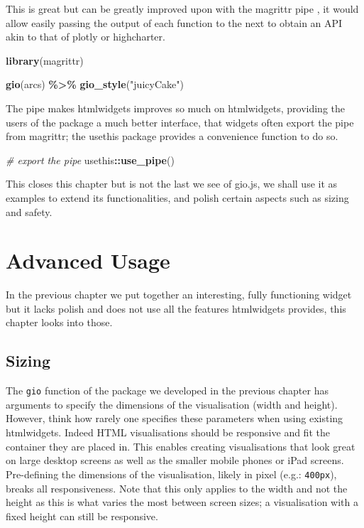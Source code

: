 \documentclass[
]{krantz}
\makeatletter
\newenvironment{Shaded}{\begin{snugshade}}{\end{snugshade}}
\newcommand{\CommentTok}[1]{\textcolor[rgb]{0.37,0.37,0.37}{\textit{#1}}}
\newcommand{\KeywordTok}[1]{\textcolor[rgb]{0.27,0.27,0.27}{\textbf{#1}}}
\newcommand{\NormalTok}[1]{#1}
\newcommand{\OperatorTok}[1]{\textcolor[rgb]{0.43,0.43,0.43}{\textbf{#1}}}
\newcommand{\StringTok}[1]{\textcolor[rgb]{0.5,0.5,0.5}{#1}}
\newenvironment{kframe}{%
\medskip{}
\setlength{\fboxsep}{.8em}
 \def\at@end@of@kframe{}%
 \ifinner\ifhmode%
  \def\at@end@of@kframe{\end{minipage}}%
  \begin{minipage}{\columnwidth}%
 \fi\fi%
 \def\FrameCommand##1{\hskip\@totalleftmargin \hskip-\fboxsep
 \colorbox{shadecolor}{##1}\hskip-\fboxsep
     \hskip-\linewidth \hskip-\@totalleftmargin \hskip\columnwidth}%
 \MakeFramed {\advance\hsize-\width
   \@totalleftmargin\z@ \linewidth\hsize
   \@setminipage}}%
 {\par\unskip\endMakeFramed%
 \at@end@of@kframe}
\renewenvironment{Shaded}{\begin{kframe}}{\end{kframe}}
\makeatother
\begin{document}
This is great but can be greatly improved upon with the magrittr pipe \citep{R-magrittr}, it would allow easily passing the output of each function to the next to obtain an API akin to that of plotly or highcharter.

\begin{Shaded}
\begin{Highlighting}[]
\KeywordTok{library}\NormalTok{(magrittr)}

\KeywordTok{gio}\NormalTok{(arcs) }\OperatorTok{\%>\%}\StringTok{ }
\StringTok{  }\KeywordTok{gio\_style}\NormalTok{(}\StringTok{"juicyCake"}\NormalTok{)}
\end{Highlighting}
\end{Shaded}

The pipe makes htmlwidgets improves so much on htmlwidgets, providing the users of the package a much better interface, that widgets often export the pipe from magrittr; the usethis package provides a convenience function to do so.

\begin{Shaded}
\begin{Highlighting}[]
\CommentTok{\# export the pipe}
\NormalTok{usethis}\OperatorTok{::}\KeywordTok{use\_pipe}\NormalTok{()}
\end{Highlighting}
\end{Shaded}

This closes this chapter but is not the last we see of gio.js, we shall use it as examples to extend its functionalities, and polish certain aspects such as sizing and safety.

\hypertarget{advanced-usage}{%
\chapter{Advanced Usage}\label{advanced-usage}}

In the previous chapter we put together an interesting, fully functioning widget but it lacks polish and does not use all the features htmlwidgets provides, this chapter looks into those.

\hypertarget{sizing}{%
\section{Sizing}\label{sizing}}

The \texttt{gio} function of the package we developed in the previous chapter has arguments to specify the dimensions of the visualisation (width and height). However, think how rarely one specifies these parameters when using existing htmlwidgets. Indeed HTML visualisations should be responsive and fit the container they are placed in. This enables creating visualisations that look great on large desktop screens as well as the smaller mobile phones or iPad screens. Pre-defining the dimensions of the visualisation, likely in pixel (e.g.: \texttt{400px}), breaks all responsiveness. Note that this only applies to the width and not the height as this is what varies the most between screen sizes; a visualisation with a fixed height can still be responsive.
\end{document}

